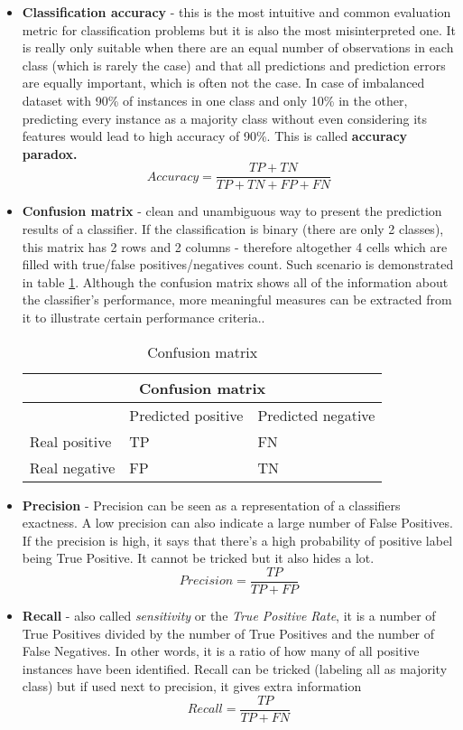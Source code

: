 \begin{itemize}
\item \textbf{Classification accuracy} - this is the most intuitive and common evaluation metric for classification problems but it is also the most misinterpreted one. It is really only suitable when there are an equal number of observations in each class (which is rarely the case) and that all predictions and prediction errors are equally important, which is often not the case. In case of imbalanced dataset with 90\% of instances in one class and only 10\% in the other, predicting every instance as a majority class without even considering its features would lead to high accuracy of 90\%. This is called \textbf{accuracy paradox.}
\[ Accuracy = \frac{TP + TN}{TP + TN + FP + FN}\]
\item \textbf{Confusion matrix} - clean and unambiguous way to present the prediction results of a classifier. If the classification is binary (there are only 2 classes), this matrix has 2 rows and 2 columns - therefore altogether 4 cells which are filled with true/false positives/negatives count. Such scenario is demonstrated in table \ref{table:Confusion_matrix_general}. Although the confusion matrix shows all of the information about the classifier's performance, more meaningful measures can be extracted from it to illustrate certain performance criteria.\cite{bradley1997use}. 
\begin{table}[H]
{
\centering
\begin{tabular}{ |p{4cm}|p{4cm}|p{4cm}|  }
 \hline
 \multicolumn{3}{|c|}{Confusion matrix} \\
 \hline
  & Predicted positive & Predicted negative\\
 \hline
 Real positive   & TP    &FN\\ \hline
 Real negative &   FP  & TN\\ \hline
\end{tabular}
}
\caption{Confusion matrix}
\label{table:Confusion_matrix_general}
\end{table}

\item \textbf{Precision} - Precision can be seen as a representation of a classifiers exactness. A low precision can also indicate a large number of False Positives. If the precision is high, it says that there's a high probability of positive label being True Positive. It cannot be tricked but it also hides a lot.
\[ Precision = \frac{TP}{TP + FP}\]
\item \textbf{Recall} - also called \textit{sensitivity} or the \textit{True Positive Rate}, it is a number of True Positives divided by the number of True Positives and the number of False Negatives. In other words, it is a ratio of how many of all positive instances have been identified. Recall can be tricked (labeling all as majority class) but if used next to precision, it gives extra information
\[ Recall = \frac{TP}{TP + FN}\]
\end{itemize}
